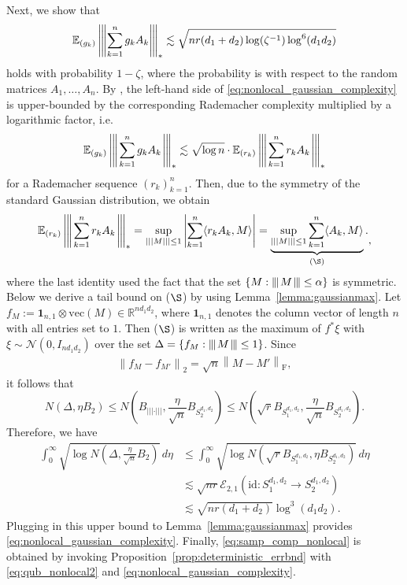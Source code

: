 \documentclass[11pt]{article}
\newcommand{\xspace}{\hbox{\kern-2.5pt}}
\newcommand\tnorm[1]{\left\vert\xspace\left\vert\xspace\left\vert\mskip2mu
#1\mskip2mu \right\vert\xspace\right\vert\xspace\right\vert}
\newcommand{\norm}[1]{\left \|#1 \right \|}
\newcommand{\E}{\mathbb{E}}
\begin{document}
Next, we show that 
\begin{equation}
\label{eq:nonlocal_gaussian_complexity}
\E_{(g_k)} \left\vert\xspace\left\vert\xspace\left\vert\sum_{k=1}^n g_{k} A_{k} \right\vert\xspace\right\vert\xspace\right\vert_{*} 
\lesssim \sqrt{nr(d_1+d_2) \log(\zeta^{-1}) \log^6(d_1 d_2)}
\end{equation} 
holds with probability $1-\zeta$, where the probability is with respect to the random matrices $A_1,\dots,A_n$. 
By \citep[Equation (4.9)]{ledoux2013probability}, the left-hand side of \eqref{eq:nonlocal_gaussian_complexity} is upper-bounded by the corresponding Rademacher complexity multiplied by a logarithmic factor, i.e. 
\begin{equation*}
\mathbb{E}_{(g_k)} \tnorm{\sum_{k=1}^n g_k A_k}_*
\lesssim \sqrt{\log n} \cdot
\mathbb{E}_{(r_k)} \tnorm{\sum_{k=1}^n r_k A_k}_*
\end{equation*}
for a Rademacher sequence $(r_k)_{k=1}^n$. Then, due to the symmetry of the standard Gaussian distribution, we obtain
\begin{equation*}
\begin{aligned}
\E_{(r_k)} \tnorm{\sum_{k=1}^n r_k A_k}_{*} 
= \sup_{\vert\vert\vert M \vert\vert\vert \leq 1} \left| \sum_{k=1}^n \langle r_k A_k, M \rangle \right| 
= \underbrace{ \sup_{\vert\vert\vert M \vert\vert\vert \leq 1}  \sum_{k=1}^n \langle A_k, M \rangle }_{\text{($\S$)}}.
\end{aligned},
\end{equation*}
where the last identity used the fact that the set $\{M: \tnorm{M} \leq \alpha\}$ is symmetric.
Below we derive a tail bound on ($\S$) by using Lemma~\ref{lemma:gaussianmax}.
Let $f_M := \mathbf{1}_{n,1} \otimes \mathrm{vec}(M) \in \mathbb{R}^{n d_1 d_2}$, where $\mathbf{1}_{n,1}$ denotes the column vector of length $n$ with all entries set to $1$.
Then ($\S$) is written as the maximum of $f^* \xi$ with $\xi \sim \mathcal{N}(0,I_{nd_1d_2})$ over the set $\Delta = \{ f_M : \tnorm{M} \leq 1 \}$.
Since 
\begin{align*}
\norm{f_M - f_{M'}}_2 
= \sqrt{n} \norm{M - M'}_\mathrm{F}, 
\end{align*}
it follows that
\[
N(\Delta, \eta B_2) 
\leq N\left( B_{\vert\vert\vert\cdot\vert\vert\vert}, \frac{\eta}{\sqrt{n}} B_{S_2^{d_1,d_2}} \right)
\leq N\left( \sqrt{r} B_{S_1^{d_1,d_2}}, \frac{\eta}{\sqrt{n}} B_{S_2^{d_1,d_2}} \right).
\]
Therefore, we have
\begin{align*}
\int_0^{\infty} \sqrt{\log N\left ( \Delta, \frac{\eta}{\sqrt{n}} B_2 \right )} \, d\eta 
& \leq 
\int_0^{\infty} \sqrt{\log N\left ( \sqrt{r} B_{S_1^{d_1,d_2}}, \eta B_{S_2^{d_1,d_2}} \right )} \, d\eta \\
& \lesssim \sqrt{nr} \mathcal{E}_{2,1}(\mathrm{id}: S_1^{d_1,d_2} \rightarrow S_2^{d_1,d_2}) \\
& \lesssim \sqrt{nr(d_1+d_2)} \log^3(d_1 d_2).
\end{align*}
Plugging in this upper bound to Lemma~\ref{lemma:gaussianmax} provides \eqref{eq:nonlocal_gaussian_complexity}. 
Finally, \eqref{eq:samp_comp_nonlocal} is obtained by invoking Proposition~\ref{prop:deterministic_errbnd} with \eqref{eq:qub_nonlocal2} and \eqref{eq:nonlocal_gaussian_complexity}. 
\end{document}
